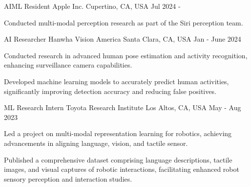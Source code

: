 


\begin{cventries}
\cventry
{AIML Resident} %
{Apple Inc.} %
{Cupertino, CA, USA} %
{Jul 2024 - } %
{ %
\begin{cvitems}
    \item Conducted multi-modal perception research as part of the Siri perception team.
\end{cvitems}
}


\cventry
{AI Researcher} %
{Hanwha Vision America} %
{Santa Clara, CA, USA} %
{Jan - June 2024} %
{ %
\begin{cvitems}
    \item Conducted research in advanced human pose estimation and activity recognition, enhancing surveillance camera capabilities.
    \item Developed machine learning models to accurately predict human activities, significantly improving detection accuracy and reducing false positives.
\end{cvitems}
}


\cventry
{ML Research Intern} %
{Toyota Research Institute} %
{Los Altos, CA, USA} %
{May - Aug 2023} %
{ %
\begin{cvitems}
    \item Led a project on multi-modal representation learning for robotics, achieving advancements
        in aligning language, vision, and tactile sensor.
    \item Published a comprehensive dataset comprising language descriptions, tactile images, and visual captures of robotic interactions, facilitating enhanced robot sensory perception and interaction studies.
\end{cvitems}
}


\end{cventries}

